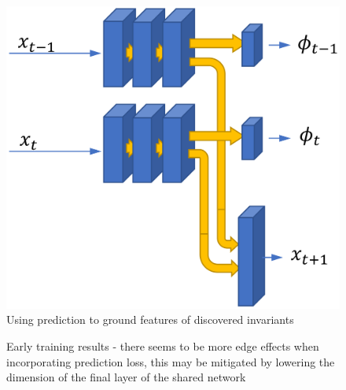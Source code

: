 \documentclass[10pt,letterpaper]{report}
\begin{document}
\begin{figure}
	\centering
	\includegraphics[width=0.7\linewidth]{./images/predNetwork}
	\caption{Using prediction to ground features of discovered invariants}
	\label{fig:prednetwork}
\end{figure}



\begin{figure}%
	\centering
	\qquad
	\qquad
	\caption{Early training results - there seems to be more edge effects when incorporating prediction loss, this may be mitigated by lowering the dimension of the final layer of the shared network }
	\label{fig:overfit}
\end{figure}
\end{document}
